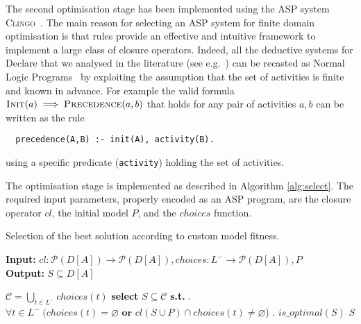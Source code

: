 The second optimisation stage has been implemented using the \ac{ASP} system \textsc{Clingo}~\cite{DBLP:journals/corr/GebserKKS14}. The main reason for selecting an \ac{ASP} system for finite domain optimisation is that rules provide an effective and intuitive framework to implement a large class of closure operators. Indeed, all the deductive systems for Declare that we analysed in the literature (see e.g.~\cite{2016-Bernardi,2017-DiCiccio}) can be recasted as Normal Logic Programs~\cite{2008-Lifschitz} by exploiting the assumption that the set of activities is finite and known in advance.
%
For example the valid formula $\textsc{Init}(a)\implies\textsc{Precedence}(a,b)$ that holds for any pair of activities $a, b$ can be written as the rule
\begin{lstlisting}
  precedence(A,B) :- init(A), activity(B).
\end{lstlisting}
using a specific predicate (\lstinline{activity}) holding the set of activities.

The optimisation stage is implemented as described in Algorithm \ref{alg:select}. The required input parameters, properly encoded as an \ac{ASP} program, are the closure operator $cl$, the initial model $P$, and the $choices$ function.



\begin{algorithm}
    \caption{Selection of the best solution according to custom model fitness.}
    \label{alg:select}
    \textbf{Input:}  ${cl}: \mathcal{P}({D[A]}) \rightarrow \mathcal{P}({D[A]}), {choices} : L^- \rightarrow \mathcal{P}({D[A]}), P$\\
    \textbf{Output:} $S \subseteq D[A]$
	\begin{algorithmic}[1] 
	\State $\mathcal{C} = \bigcup_{t\in L^-} choices(t)$\label{alg:buildC}
	\State \textbf{select} $S \subseteq \mathcal{C}$ \textbf{s.t.} \label{alg:subsetC}
	\Indent
		. $\forall t \in L^- \; ({choices}(t) = \varnothing \textbf{ or } {cl}(S \cup P)\cap {choices}(t) \neq \varnothing$) 	\label{alg:select:1}
		. $is\_optimal(S)$									\label{alg:select:2}
	\EndIndent
	\State \Return $S$  %
    \EndProcedure
    \end{algorithmic}
\end{algorithm}


